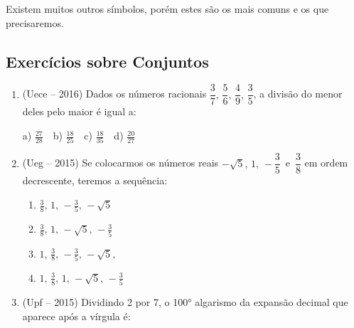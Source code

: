 \begin{multicols*}{2}
        
        
        
        
        
        
        Existem muitos outros símbolos, porém estes são os mais comuns e os que precisaremos.
        

		\subsection{Exercícios sobre Conjuntos}

	\begin{enumerate}
		
	\item (Uece – 2016) Dados os números racionais $ \dfrac{3}{7},\, \dfrac{5}{6},\, \dfrac{4}{9},\, \dfrac{3}{5}$, a divisão do menor deles pelo maior é igual a: 
		
		a) $\frac{27}{28} \ \ \ $ b) $\frac{18}{25} \ \ \ $ c) $\frac{18}{35} \ \ \ $ d) $\frac{20}{27}$

	\item (Ueg – 2015) Se colocarmos os números reais $ - \sqrt{5},\, 1,\, - \dfrac{3}{5}\, $ e $\, \dfrac{3}{8}$ em ordem decrescente, teremos a sequência: 

		\begin{enumerate}
		
		\item $\frac{3}{8},\, 1,\,- \frac{3}{5},\, -\sqrt{5}$ 
		\item $\frac{3}{8},\, 1,\,-\sqrt{5},\, - \frac{3}{5}$ 
		\item $1,\, \frac{3}{8},\, - \frac{3}{5},\, -\sqrt{5},$
		\item $1,\, \frac{3}{8},\, 1,\, -\sqrt{5},\, - \frac{3}{5}$

		\end{enumerate}

	\item (Upf – 2015) Dividindo 2 por 7, o 100° algarismo da expansão decimal que aparece após a vírgula é: 
		

\end{enumerate}
\end{multicols*}
